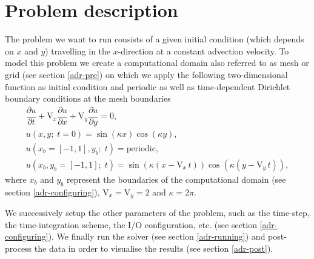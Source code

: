 \section{Problem description}
The problem we want to run consists of a given initial condition (which depends on $x$ and $y$) 
travelling in the $x$-direction at a constant advection velocity. To model this problem we create 
a computational domain also referred to as mesh or grid (see section \ref{adr-pre}) on which we apply 
the following two-dimensional function as initial condition and periodic as well as time-dependent Dirichlet 
boundary conditions at the mesh boundaries
%
\begin{equation}
\begin{array}{l}
\dfrac{\partial u}{\partial t} + \text{V}_{x}\dfrac{\partial u}{\partial x} + \text{V}_{y}\dfrac{\partial u}{\partial y} = 0,\\[1em]
u(x,y;\;t=0) = \sin(\kappa x) \cos(\kappa y),\\[1em]
u(x_{b} = [-1, 1],y_{b};\;t) = \text{periodic},\\[1em]
u(x_{b},y_{b} = [-1, 1];\;t) = \sin(\kappa (x - \text{V}_{x}\,t)) \cos(\kappa (y - \text{V}_{y}\,t)),
\end{array}
\label{eq:advection-2d}
\end{equation}
%
where $x_{b}$ and $y_{b}$ represent the boundaries of the computational domain (see section \ref{adr-configuring}), 
$\text{V}_{x} = \text{V}_{y} = 2$ and $\kappa = 2\pi$.

We successively setup the other parameters of the problem, such as the time-step, the time-integration 
scheme, the I/O configuration, etc. (see section \ref{adr-configuring}). We finally run the solver (see section 
\ref{adr-running}) and post-process the data in order to visualise the results (see section \ref{adr-post}).

